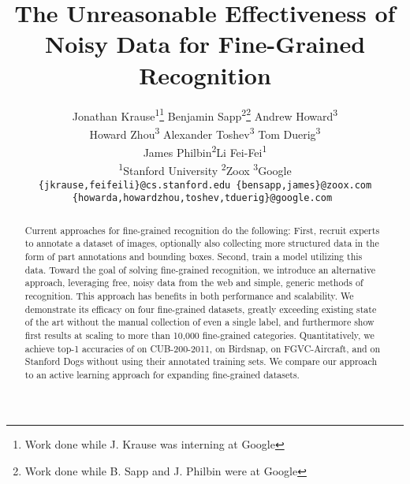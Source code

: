 \documentclass[runningheads]{llncs}
\begin{document}
\pagestyle{headings}
\mainmatter


\def\etal{\emph{et al.}}
\def\ie{\emph{i.e.~}}
\def\eg{\emph{e.g.~}}
\newcommand{\no}[1]{}
\newcommand{\lbird}{L-Bird}
\newcommand{\lair}{L-Aircraft}
\newcommand{\llep}{L-Butterfly}
\newcommand{\ldog}{L-Dog}
\newcommand{\fgvc}{FGVC}
\newcommand{\fgvcgt}{FGVC-GT}
\newcommand{\cubgt}{CUB-GT}
\newcommand{\birdsnapgt}{Birdsnap-GT}
\newcommand{\doggt}{Dogs-GT}
\newcommand{\argmin}{\mathop{\arg\min}}
\newcommand{\argmax}{\mathop{\arg\max}}

\newcommand{\repeatthanks}{\textsuperscript{\thefootnote}}

\title{The Unreasonable Effectiveness of Noisy Data for Fine-Grained Recognition}


\authorrunning{Krause \etal}

\author{
  Jonathan Krause\textsuperscript{1}\thanks{Work done while J. Krause was interning at Google} \quad Benjamin Sapp\textsuperscript{2}\thanks{Work done while B. Sapp and J. Philbin were at Google} \quad Andrew Howard\textsuperscript{3} \\
  Howard Zhou\textsuperscript{3} \quad Alexander Toshev\textsuperscript{3} \quad Tom Duerig\textsuperscript{3} \\
  James Philbin\textsuperscript{2}\repeatthanks  \quad Li Fei-Fei\textsuperscript{1} \\
  \textsuperscript{1}Stanford University \qquad \textsuperscript{2}Zoox \qquad \textsuperscript{3}Google\\
  {\tt\small \{jkrause,feifeili\}@cs.stanford.edu \quad \{bensapp,james\}@zoox.com} \\
  {\tt\small \{howarda,howardzhou,toshev,tduerig\}@google.com }
}

\institute{} 

\maketitle

\begin{abstract}
Current approaches for fine-grained recognition do the following: First, recruit experts to annotate a dataset of images, optionally also collecting more structured data in the form of part annotations and bounding boxes.
Second, train a model utilizing this data.
Toward the goal of solving fine-grained recognition, we introduce an alternative approach, leveraging free, noisy data from the web and simple, generic methods of recognition.
This approach has benefits in both performance and scalability.
We demonstrate its efficacy on four fine-grained datasets, greatly exceeding existing state of the art without the manual collection of even a single label, and furthermore show first results at scaling to more than 10,000 fine-grained categories.
Quantitatively, we achieve top-1 accuracies of  on CUB-200-2011,  on Birdsnap,  on FGVC-Aircraft, and  on Stanford Dogs without using their annotated training sets.
We compare our approach to an active learning approach for expanding fine-grained datasets.
\end{abstract}
\end{document}
